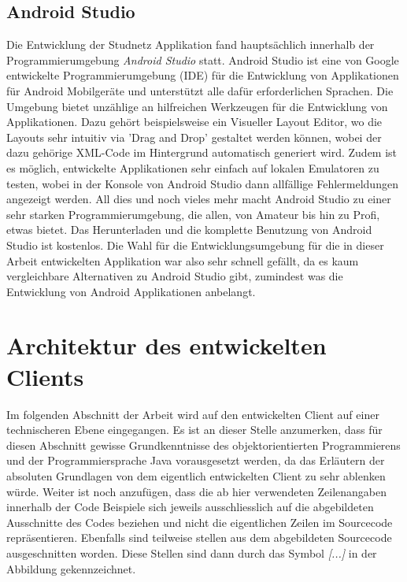 \documentclass[../main.tex]{subfiles}
\begin{document}
	\subsection{Android Studio}
	Die Entwicklung der Studnetz Applikation fand hauptsächlich innerhalb der Programmierumgebung \emph{Android Studio} statt. Android Studio ist eine von Google entwickelte Programmierumgebung (IDE) für die Entwicklung von Applikationen für Android Mobilgeräte und unterstützt alle dafür erforderlichen Sprachen. Die Umgebung bietet unzählige an hilfreichen Werkzeugen für die Entwicklung von Applikationen. Dazu gehört beispielsweise ein Visueller Layout Editor, wo die Layouts sehr intuitiv via 'Drag and Drop' gestaltet werden können, wobei der dazu gehörige XML-Code im Hintergrund automatisch generiert wird. Zudem ist es möglich, entwickelte Applikationen sehr einfach auf lokalen Emulatoren zu testen, wobei in der Konsole von Android Studio dann allfällige Fehlermeldungen angezeigt werden. All dies und noch vieles mehr macht Android Studio zu einer sehr starken Programmierumgebung, die allen, von Amateur bis hin zu Profi, etwas bietet. Das Herunterladen und die komplette Benutzung von Android Studio ist kostenlos. Die Wahl für die Entwicklungsumgebung für die in dieser Arbeit entwickelten Applikation war also sehr schnell gefällt, da es kaum vergleichbare Alternativen zu Android Studio gibt, zumindest was die Entwicklung von Android Applikationen anbelangt.
	
	\section{Architektur des entwickelten Clients}
	Im folgenden Abschnitt der Arbeit wird auf den entwickelten Client auf einer technischeren Ebene eingegangen. Es ist an dieser Stelle anzumerken, dass für diesen Abschnitt gewisse Grundkenntnisse des objektorientierten Programmierens und der Programmiersprache Java vorausgesetzt werden, da das Erläutern der absoluten Grundlagen von dem eigentlich entwickelten Client zu sehr ablenken würde. Weiter ist noch anzufügen, dass die ab hier verwendeten Zeilenangaben innerhalb der Code Beispiele sich jeweils ausschliesslich auf die abgebildeten Ausschnitte des Codes beziehen und nicht die eigentlichen Zeilen im Sourcecode repräsentieren. Ebenfalls sind teilweise stellen aus dem abgebildeten Sourcecode ausgeschnitten worden. Diese Stellen sind dann durch das Symbol \emph{[...]} in der Abbildung gekennzeichnet.
	
	
\end{document}
